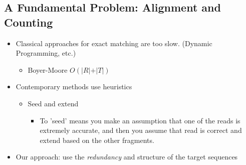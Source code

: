 \documentclass[10pt]{article}
\begin{document}
\subsection*{A Fundamental Problem: Alignment and Counting}
\begin{itemize}
    \item Classical approaches for exact matching are too slow.  (Dynamic Programming, etc.)
    \begin{itemize}
        \item Boyer-Moore $O(\vert R \vert + \vert T \vert)$\
    \end{itemize}
    \item Contemporary methods use heuristics
    \begin{itemize}
        \item Seed and extend
        \begin{itemize}
            \item To 'seed' means you make an assumption that one of the reads is extremely accurate, and then you assume that read is correct and extend based on the other fragments.
        \end{itemize}
    \end{itemize}
    \item Our approach: use the \textit{redundancy} and structure of the target sequences
\end{itemize}
\end{document}

